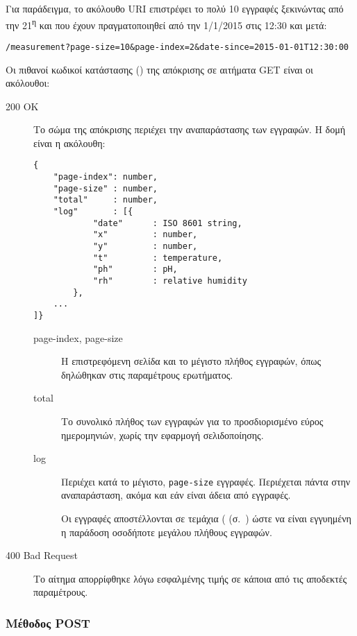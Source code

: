 Για παράδειγμα, το ακόλουθο URI επιστρέφει το πολύ 10 εγγραφές ξεκινώντας από
την 21\textsuperscript{η} και που έχουν πραγματοποιηθεί από την 1/1/2015 στις
12:30 και μετά:
\begin{lstlisting}
/measurement?page-size=10&page-index=2&date-since=2015-01-01T12:30:00
\end{lstlisting}

Οι πιθανοί κωδικοί κατάστασης () της απόκρισης σε αιτήματα GET
είναι οι ακόλουθοι:
\begin{description}
    \item[200 OK] Το σώμα της απόκρισης περιέχει την αναπαράστασης των εγγραφών.
    Η δομή είναι η ακόλουθη:
    \begin{lstlisting}
{
    "page-index": number,
    "page-size" : number,
    "total"     : number,
    "log"       : [{
            "date"      : ISO 8601 string,
            "x"         : number,
            "y"         : number,
            "t"         : temperature,
            "ph"        : pH,
            "rh"        : relative humidity
        },
    ...
]}
    \end{lstlisting}
    \begin{description}
        \item[page-index, page-size] Η επιστρεφόμενη σελίδα και το μέγιστο
        πλήθος εγγραφών, όπως δηλώθηκαν στις παραμέτρους ερωτήματος.

        \item[total] Το συνολικό πλήθος των εγγραφών για το προσδιορισμένο
        εύρος ημερομηνιών, χωρίς την εφαρμογή σελιδοποίησης.

        \item[log] Περιέχει κατά το μέγιστο, \verb~page-size~ εγγραφές.
        Περιέχεται πάντα στην αναπαράσταση, ακόμα και εάν είναι άδεια από
        εγγραφές.

        Οι εγγραφές αποστέλλονται σε τεμάχια
        (
        (σ.~\pageref{ssubsec:network:chunked-output}) ώστε να είναι εγγυημένη η
        παράδοση οσοδήποτε μεγάλου πλήθους εγγραφών.
    \end{description}

    \item[400 Bad Request] Το αίτημα απορρίφθηκε λόγω εσφαλμένης τιμής σε κάποια
    από τις αποδεκτές παραμέτρους.
\end{description}


\subsubsection{Μέθοδος POST}
\label{ssubsec:network:measurement-post}

